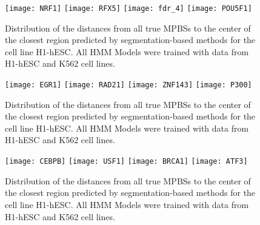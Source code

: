 \documentclass[11pt,a4]{article}
\begin{document}
\begin{figure}[h]
\centering
    \texttt{[image: NRF1]}
    \texttt{[image: RFX5]}
    \texttt{[image: fdr\_4]}
    \texttt{[image: POU5F1]}
\caption{Distribution of the distances from all true MPBSs to the center of the closest region predicted by segmentation-based methods for the cell line H1-hESC. All HMM Models were trained with data from H1-hESC and K562 cell lines.}
\label{fig:boxplot.H1hesc.fdr_4.6}
\end{figure}

\begin{figure}[h]
\centering
    \texttt{[image: EGR1]}
    \texttt{[image: RAD21]}
    \texttt{[image: ZNF143]}
    \texttt{[image: P300]}
\caption{Distribution of the distances from all true MPBSs to the center of the closest region predicted by segmentation-based methods for the cell line H1-hESC. All HMM Models were trained with data from H1-hESC and K562 cell lines.}
\label{fig:boxplot.H1hesc.fdr_4.7}
\end{figure}

\begin{figure}[h]
\centering
    \texttt{[image: CEBPB]}
    \texttt{[image: USF1]}
    \texttt{[image: BRCA1]}
    \texttt{[image: ATF3]}
\caption{Distribution of the distances from all true MPBSs to the center of the closest region predicted by segmentation-based methods for the cell line H1-hESC. All HMM Models were trained with data from H1-hESC and K562 cell lines.}
\label{fig:boxplot.H1hesc.fdr_4.8}
\end{figure}
\end{document}
